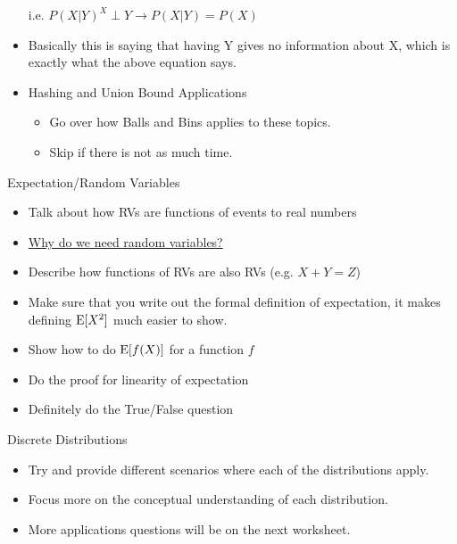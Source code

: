 \documentclass{exam}
\begin{document}
\begin{questions}
\begin{itemize}
i.e. $P(X|Y) ^ X \perp Y \rightarrow P(X|Y) = P(X)$
\item Basically this is saying that having Y gives no information about X, which is exactly what the above equation says.
\item Hashing and Union Bound Applications
\begin{itemize}
\item Go over how Balls and Bins applies to these topics.
\item Skip if there is not as much time.
\end{itemize}
\end{itemize}
\item Expectation/Random Variables
\begin{itemize}
\item Talk about how RVs are functions of events to real numbers
\item \href{http://mathoverflow.net/questions/250500/why-do-we-need-random-variables}{Why do we need random variables?}
\item Describe how functions of RVs are also RVs (e.g. $X + Y = Z$)
\item Make sure that you write out the formal definition of expectation, it makes defining $\text{E}[X^2]$ much easier to show.
\item Show how to do $\text{E}[f(X)]$ for a function $f$
\item Do the proof for linearity of expectation
\item Definitely do the True/False question
\end{itemize}
\item Discrete Distributions
\begin{itemize}
\item Try and provide different scenarios where each of the distributions apply.
\item Focus more on the conceptual understanding of each distribution.
\item More applications questions will be on the next worksheet.
\end{itemize}
\end{questions}
\end{document}
